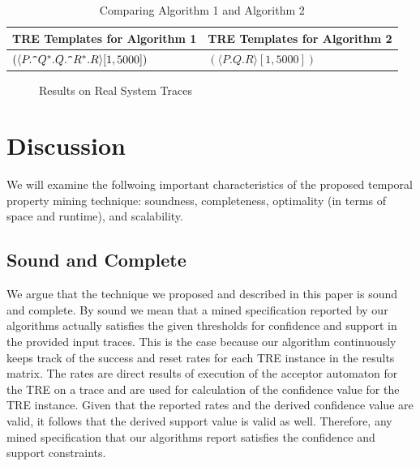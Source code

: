 \documentclass[]{sigplanconf}
\begin{document}


\begin{table}[!ht]
	\centering
	\begin{tabular}{|l|l|}
		\hline
		\textbf{TRE Templates for Algorithm 1} & \textbf{TRE Templates for Algorithm 2} \\
		\hline
		 $(\langle P.\verb!^!Q^*.Q.\verb!^!R^*.R \rangle [1, 5000])$& $(\langle P.Q.R \rangle [1, 5000])$ \\
	\end{tabular}

	\caption{Comparing Algorithm 1 and Algorithm 2}
	\label{miningOverhead}
\end{table}


\begin{figure}[!ht]
  \centering
  \caption{Results on Real System Traces}\label{Algs_real}
\end{figure}

\section{Discussion} \label{discussion}

We will examine the follwoing important characteristics of the proposed temporal property mining technique: soundness, completeness, optimality (in terms of space and runtime), and scalability.


\subsection{Sound and Complete}

We argue that the technique we proposed and described in this paper is sound and complete. By sound we mean that a mined specification reported by our algorithms actually satisfies the given thresholds for confidence and support in the provided input traces. This is the case because our algorithm continuously keeps track of the success and reset rates for each TRE instance in the results matrix. The rates are direct results of execution of the acceptor automaton for the TRE on a trace and are used for calculation of the confidence value for the TRE instance. Given that the reported rates and the derived confidence value are valid, it follows that the derived support value is valid as well. Therefore, any mined specification that our algorithms report satisfies the confidence and support constraints.
\end{document}
